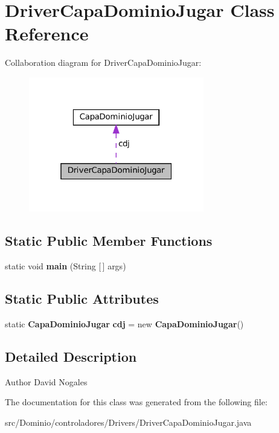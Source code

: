 \section{Driver\+Capa\+Dominio\+Jugar Class Reference}
\label{class_dominio_1_1controladores_1_1_drivers_1_1_driver_capa_dominio_jugar}


Collaboration diagram for Driver\+Capa\+Dominio\+Jugar\+:
\nopagebreak
\begin{figure}[H]
\begin{center}
\leavevmode
\includegraphics[width=217pt]{class_dominio_1_1controladores_1_1_drivers_1_1_driver_capa_dominio_jugar__coll__graph}
\end{center}
\end{figure}
\subsection*{Static Public Member Functions}
\begin{DoxyCompactItemize}
\item 
\mbox{\label{class_dominio_1_1controladores_1_1_drivers_1_1_driver_capa_dominio_jugar_a31b15a500be1892e96d81c271adffacb}} 
static void {\bfseries main} (String [$\,$] args)
\end{DoxyCompactItemize}
\subsection*{Static Public Attributes}
\begin{DoxyCompactItemize}
\item 
\mbox{\label{class_dominio_1_1controladores_1_1_drivers_1_1_driver_capa_dominio_jugar_afe0f5ee095f3e67c1788a88369446141}} 
static \textbf{ Capa\+Dominio\+Jugar} {\bfseries cdj} = new \textbf{ Capa\+Dominio\+Jugar}()
\end{DoxyCompactItemize}


\subsection{Detailed Description}
\begin{DoxyAuthor}{Author}
David Nogales 
\end{DoxyAuthor}


The documentation for this class was generated from the following file\+:\begin{DoxyCompactItemize}
\item 
src/\+Dominio/controladores/\+Drivers/Driver\+Capa\+Dominio\+Jugar.\+java\end{DoxyCompactItemize}
